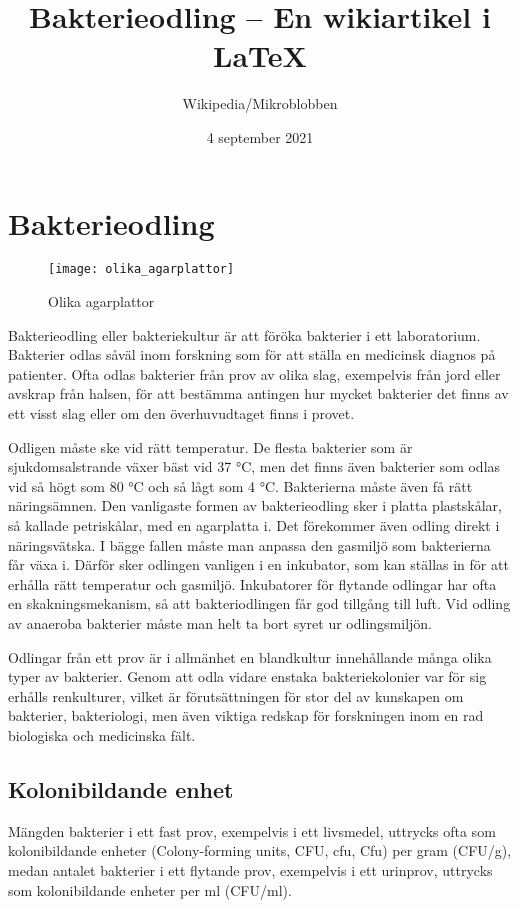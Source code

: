 \documentclass{article}
\title{Bakterieodling – En wikiartikel i \LaTeX}
\author{Wikipedia/Mikroblobben}
\date{4 september 2021} %
\begin{document}
\maketitle

\section{Bakterieodling}
\begin{figure}[H] %
  \center
  \texttt{[image: olika\_agarplattor]}
  \caption{Olika agarplattor}
\end{figure}

Bakterieodling eller bakteriekultur är att föröka bakterier i ett laboratorium. Bakterier odlas såväl inom forskning som för att ställa en medicinsk diagnos på patienter. Ofta odlas bakterier från prov av olika slag, exempelvis från jord eller avskrap från halsen, för att bestämma antingen hur mycket bakterier det finns av ett visst slag eller om den överhuvudtaget finns i provet.

Odligen måste ske vid rätt temperatur. De flesta bakterier som är sjukdomsalstrande växer bäst vid 37 °C, men det finns även bakterier som odlas vid så högt som 80 °C och så lågt som 4 °C. Bakterierna måste även få rätt näringsämnen. Den vanligaste formen av bakterieodling sker i platta plastskålar, så kallade petriskålar, med en agarplatta i. Det förekommer även odling direkt i näringsvätska. I bägge fallen måste man anpassa den gasmiljö som bakterierna får växa i. Därför sker odlingen vanligen i en inkubator, som kan ställas in för att erhålla rätt temperatur och gasmiljö. Inkubatorer för flytande odlingar har ofta en skakningsmekanism, så att bakteriodlingen får god tillgång till luft. Vid odling av anaeroba bakterier måste man helt ta bort syret ur odlingsmiljön.

Odlingar från ett prov är i allmänhet en blandkultur innehållande många olika typer av bakterier. Genom att odla vidare enstaka bakteriekolonier var för sig erhålls renkulturer, vilket är förutsättningen för stor del av kunskapen om bakterier, bakteriologi, men även viktiga redskap för forskningen inom en rad biologiska och medicinska fält.

\subsection{Kolonibildande enhet}
Mängden bakterier i ett fast prov, exempelvis i ett livsmedel, uttrycks ofta som kolonibildande enheter (Colony-forming units, CFU, cfu, Cfu) per gram (CFU/g), medan antalet bakterier i ett flytande prov, exempelvis i ett urinprov, uttrycks som kolonibildande enheter per ml (CFU/ml).\cite{SLU}
\end{document}
